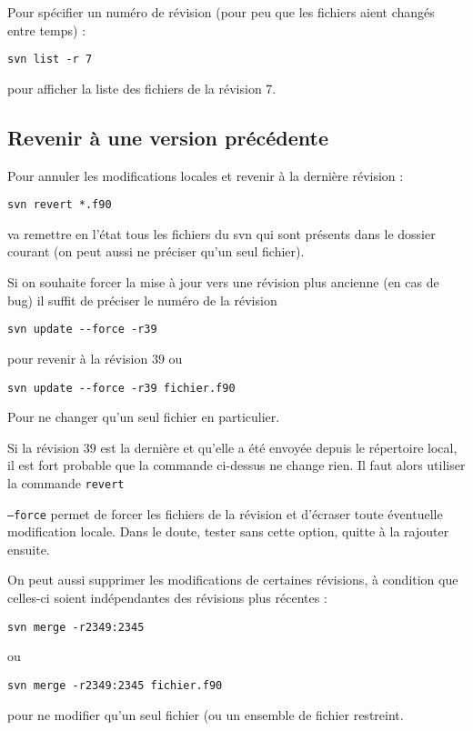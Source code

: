 \documentclass[a4paper,twoside]{article}
\begin{document}
Pour spécifier un numéro de révision (pour peu que les fichiers aient changés entre temps) : 
\begin{verbatim}
svn list -r 7
\end{verbatim}
pour afficher la liste des fichiers de la révision 7.

\subsection{Revenir à une version précédente}
Pour annuler les modifications locales et revenir à la dernière révision : 
\begin{verbatim}
svn revert *.f90
\end{verbatim}
va remettre en l'état tous les fichiers du svn qui sont présents dans le dossier courant (on peut aussi ne préciser qu'un seul fichier).

\bigskip

Si on souhaite forcer la mise à jour vers une révision plus ancienne (en cas de bug) il suffit de préciser le numéro de la révision
\begin{verbatim}
svn update --force -r39
\end{verbatim}
pour revenir à la révision $39$ ou 
\begin{verbatim}
svn update --force -r39 fichier.f90
\end{verbatim}
Pour ne changer qu'un seul fichier en particulier.

\begin{remarque}
Si la révision $39$ est la dernière et qu'elle a été envoyée depuis le répertoire local, il est fort probable que la commande ci-dessus ne change rien. Il faut alors utiliser la commande \texttt{revert}

\texttt{--force} permet de forcer les fichiers de la révision et d'écraser toute éventuelle modification locale. Dans le doute, tester sans cette option, quitte à la rajouter ensuite.
\end{remarque}


\bigskip

On peut aussi supprimer les modifications de certaines révisions, à condition que celles-ci soient indépendantes des révisions plus récentes : 
\begin{verbatim}
svn merge -r2349:2345
\end{verbatim}
ou
\begin{verbatim}
svn merge -r2349:2345 fichier.f90
\end{verbatim}
pour ne modifier qu'un seul fichier (ou un ensemble de fichier restreint.
\end{document}
